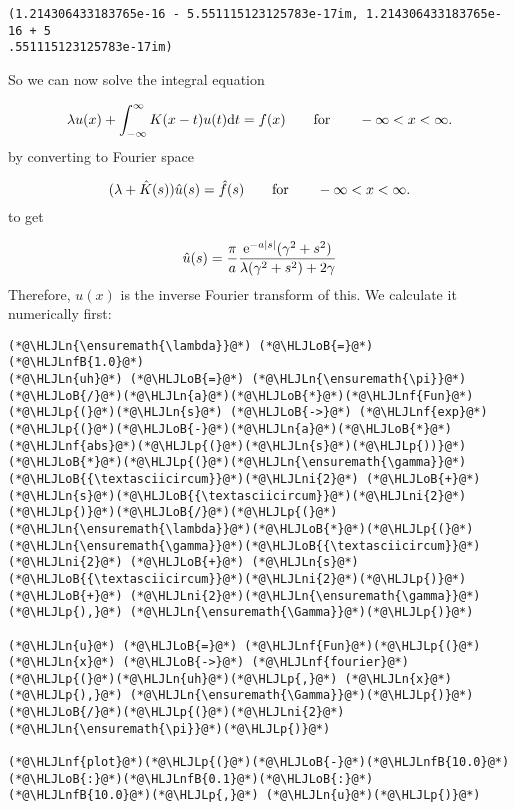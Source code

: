 \documentclass[12pt,landscape]{article}
\newcommand{\HLJLn}[1]{#1}
\newcommand{\HLJLnf}[1]{\textcolor[RGB]{66,102,213}{#1}}
\newcommand{\HLJLnfB}[1]{\textcolor[RGB]{59,151,46}{#1}}
\newcommand{\HLJLni}[1]{\textcolor[RGB]{59,151,46}{#1}}
\newcommand{\HLJLoB}[1]{\textcolor[RGB]{102,102,102}{\textbf{#1}}}
\newcommand{\HLJLp}[1]{#1}
\def\qqfor{\qquad\hbox{for}\qquad}
\def\D{ {\rm d} }
\def\E{ {\rm e} }
\def\dt{\D t}
\begin{document}
{\begin{lstlisting}
(1.214306433183765e-16 - 5.551115123125783e-17im, 1.214306433183765e-16 + 5
.551115123125783e-17im)
\end{lstlisting}


So we can now solve the integral equation

\[
\lambda u(x) + \int_{-\infty}^\infty K(x-t)u(t) \dt = f(x)\qqfor -\infty < x < \infty.
\]
by converting to Fourier space

\[
(\lambda + \hat K(s)) \hat u(s)  = \hat f(s)\qqfor -\infty < x < \infty.
\]
to get

\[
\hat u(s) = {\pi \over a} { \E^{-a |s|} (\gamma^2+s^2) \over \lambda (\gamma^2+s^2) + 2\gamma}
\]
Therefore, $u(x)$ is the inverse Fourier transform of this. We calculate it numerically first:


\begin{lstlisting}
(*@\HLJLn{\ensuremath{\lambda}}@*) (*@\HLJLoB{=}@*) (*@\HLJLnfB{1.0}@*)
(*@\HLJLn{uh}@*) (*@\HLJLoB{=}@*) (*@\HLJLn{\ensuremath{\pi}}@*)(*@\HLJLoB{/}@*)(*@\HLJLn{a}@*)(*@\HLJLoB{*}@*)(*@\HLJLnf{Fun}@*)(*@\HLJLp{(}@*)(*@\HLJLn{s}@*) (*@\HLJLoB{->}@*) (*@\HLJLnf{exp}@*)(*@\HLJLp{(}@*)(*@\HLJLoB{-}@*)(*@\HLJLn{a}@*)(*@\HLJLoB{*}@*)(*@\HLJLnf{abs}@*)(*@\HLJLp{(}@*)(*@\HLJLn{s}@*)(*@\HLJLp{))}@*)(*@\HLJLoB{*}@*)(*@\HLJLp{(}@*)(*@\HLJLn{\ensuremath{\gamma}}@*)(*@\HLJLoB{{\textasciicircum}}@*)(*@\HLJLni{2}@*) (*@\HLJLoB{+}@*) (*@\HLJLn{s}@*)(*@\HLJLoB{{\textasciicircum}}@*)(*@\HLJLni{2}@*)(*@\HLJLp{)}@*)(*@\HLJLoB{/}@*)(*@\HLJLp{(}@*)(*@\HLJLn{\ensuremath{\lambda}}@*)(*@\HLJLoB{*}@*)(*@\HLJLp{(}@*)(*@\HLJLn{\ensuremath{\gamma}}@*)(*@\HLJLoB{{\textasciicircum}}@*)(*@\HLJLni{2}@*) (*@\HLJLoB{+}@*) (*@\HLJLn{s}@*)(*@\HLJLoB{{\textasciicircum}}@*)(*@\HLJLni{2}@*)(*@\HLJLp{)}@*) (*@\HLJLoB{+}@*) (*@\HLJLni{2}@*)(*@\HLJLn{\ensuremath{\gamma}}@*)(*@\HLJLp{),}@*) (*@\HLJLn{\ensuremath{\Gamma}}@*)(*@\HLJLp{)}@*)

(*@\HLJLn{u}@*) (*@\HLJLoB{=}@*) (*@\HLJLnf{Fun}@*)(*@\HLJLp{(}@*)(*@\HLJLn{x}@*) (*@\HLJLoB{->}@*) (*@\HLJLnf{fourier}@*)(*@\HLJLp{(}@*)(*@\HLJLn{uh}@*)(*@\HLJLp{,}@*) (*@\HLJLn{x}@*)(*@\HLJLp{),}@*) (*@\HLJLn{\ensuremath{\Gamma}}@*)(*@\HLJLp{)}@*)(*@\HLJLoB{/}@*)(*@\HLJLp{(}@*)(*@\HLJLni{2}@*)(*@\HLJLn{\ensuremath{\pi}}@*)(*@\HLJLp{)}@*)

(*@\HLJLnf{plot}@*)(*@\HLJLp{(}@*)(*@\HLJLoB{-}@*)(*@\HLJLnfB{10.0}@*)(*@\HLJLoB{:}@*)(*@\HLJLnfB{0.1}@*)(*@\HLJLoB{:}@*)(*@\HLJLnfB{10.0}@*)(*@\HLJLp{,}@*) (*@\HLJLn{u}@*)(*@\HLJLp{)}@*)
\end{lstlisting}

}
\end{document}
